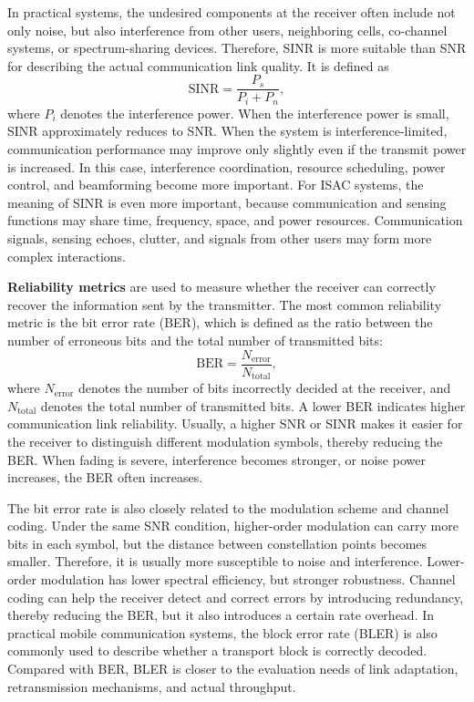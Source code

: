 In practical systems,
the undesired components at the receiver often include not only noise,
but also interference from other users,
neighboring cells,
co-channel systems,
or spectrum-sharing devices.
Therefore,
SINR is more suitable than SNR for describing the actual communication link quality.
It is defined as
\begin{equation}
    \mathrm{SINR}
    =
    \frac{P_s}{P_i + P_n},
    \label{eq:sinr-definition}
\end{equation}
where
\(P_i\) denotes the interference power.
When the interference power is small,
SINR approximately reduces to SNR.
When the system is interference-limited,
communication performance may improve only slightly even if the transmit power is increased.
In this case,
interference coordination,
resource scheduling,
power control,
and beamforming become more important.
For ISAC systems,
the meaning of SINR is even more important,
because communication and sensing functions may share time,
frequency,
space,
and power resources.
Communication signals,
sensing echoes,
clutter,
and signals from other users may form more complex interactions.

\textbf{Reliability metrics} are used to measure whether the receiver can correctly recover the information sent by the transmitter.
The most common reliability metric is the bit error rate (BER),
which is defined as the ratio between the number of erroneous bits and the total number of transmitted bits:
\begin{equation}
    \mathrm{BER}
    =
    \frac{N_{\mathrm{error}}}{N_{\mathrm{total}}},
    \label{eq:ber-definition}
\end{equation}
where
\(N_{\mathrm{error}}\) denotes the number of bits incorrectly decided at the receiver,
and \(N_{\mathrm{total}}\) denotes the total number of transmitted bits.
A lower BER indicates higher communication link reliability.
Usually,
a higher SNR or SINR makes it easier for the receiver to distinguish different modulation symbols,
thereby reducing the BER.
When fading is severe,
interference becomes stronger,
or noise power increases,
the BER often increases.

The bit error rate is also closely related to the modulation scheme and channel coding.
Under the same SNR condition,
higher-order modulation can carry more bits in each symbol,
but the distance between constellation points becomes smaller.
Therefore,
it is usually more susceptible to noise and interference.
Lower-order modulation has lower spectral efficiency,
but stronger robustness.
Channel coding can help the receiver detect and correct errors by introducing redundancy,
thereby reducing the BER,
but it also introduces a certain rate overhead.
In practical mobile communication systems,
the block error rate (BLER) is also commonly used
to describe whether a transport block is correctly decoded.
Compared with BER,
BLER is closer to the evaluation needs of link adaptation,
retransmission mechanisms,
and actual throughput.

